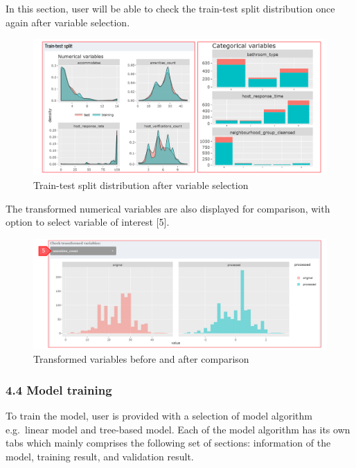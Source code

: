 \documentclass[
  12pt,
]{article}
\begin{document}
In this section, user will be able to check the train-test split
distribution once again after variable selection.

\begin{figure}[H]

{\centering \includegraphics[width=0.95\linewidth]{images/datatrf2} 

}

\caption{Train-test split distribution after variable selection}\label{fig:unnamed-chunk-23}
\end{figure}

The transformed numerical variables are also displayed for comparison,
with option to select variable of interest {[}5{]}.

\begin{figure}[H]

{\centering \includegraphics[width=0.95\linewidth]{images/datatrf3} 

}

\caption{Transformed variables before and after comparison}\label{fig:unnamed-chunk-24}
\end{figure}

\hypertarget{model-training}{%
\subsubsection{4.4 Model training}\label{model-training}}

To train the model, user is provided with a selection of model algorithm
e.g.~linear model and tree-based model. Each of the model algorithm has
its own tabs which mainly comprises the following set of sections:
information of the model, training result, and validation result.
\end{document}
